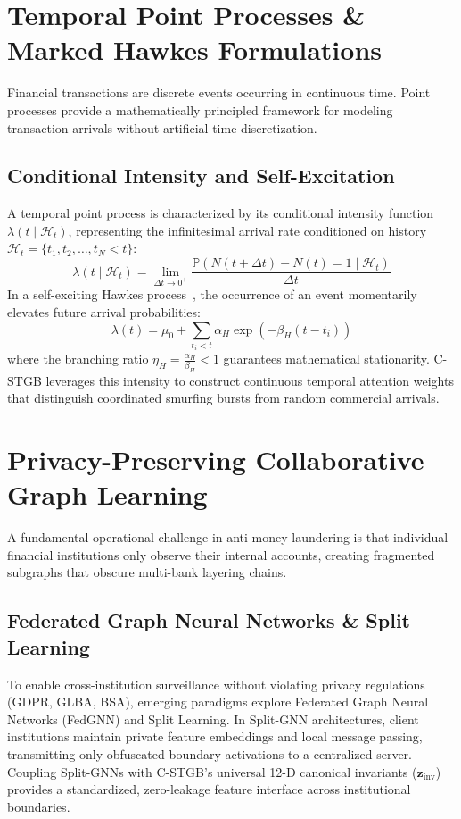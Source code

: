 \section{Temporal Point Processes \& Marked Hawkes Formulations}
Financial transactions are discrete events occurring in continuous time. Point processes provide a mathematically principled framework for modeling transaction arrivals without artificial time discretization.

\subsection{Conditional Intensity and Self-Excitation}
A temporal point process is characterized by its conditional intensity function $\lambda(t \mid \mathcal{H}_t)$, representing the infinitesimal arrival rate conditioned on history $\mathcal{H}_t = \{t_1, t_2, \dots, t_N < t\}$:
\begin{equation}
\lambda(t \mid \mathcal{H}_t) = \lim_{\Delta t \to 0^+} \frac{\mathbb{P}\left( N(t + \Delta t) - N(t) = 1 \mid \mathcal{H}_t \right)}{\Delta t}
\end{equation}
In a self-exciting Hawkes process~\cite{hawkes1971spectra}, the occurrence of an event momentarily elevates future arrival probabilities:
\begin{equation}
\lambda(t) = \mu_0 + \sum_{t_i < t} \alpha_H \exp\left( -\beta_H (t - t_i) \right)
\end{equation}
where the branching ratio $\eta_H = \frac{\alpha_H}{\beta_H} < 1$ guarantees mathematical stationarity. C-STGB leverages this intensity to construct continuous temporal attention weights that distinguish coordinated smurfing bursts from random commercial arrivals.

\section{Privacy-Preserving Collaborative Graph Learning}
A fundamental operational challenge in anti-money laundering is that individual financial institutions only observe their internal accounts, creating fragmented subgraphs that obscure multi-bank layering chains.

\subsection{Federated Graph Neural Networks \& Split Learning}
To enable cross-institution surveillance without violating privacy regulations (GDPR, GLBA, BSA), emerging paradigms explore Federated Graph Neural Networks (FedGNN) and Split Learning. In Split-GNN architectures, client institutions maintain private feature embeddings and local message passing, transmitting only obfuscated boundary activations to a centralized server. Coupling Split-GNNs with C-STGB's universal 12-D canonical invariants ($\mathbf{z}_{\text{inv}}$) provides a standardized, zero-leakage feature interface across institutional boundaries.

